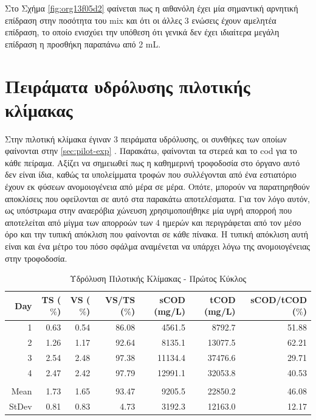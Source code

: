 \documentclass[11pt]{report}
\begin{document}
Στο Σχήμα \ref{fig:org13f05d2} φαίνεται πως η αιθανόλη έχει μία σημαντική αρνητική επίδραση στην ποσότητα του \acrshort{mix} και ότι οι άλλες 3 ενώσεις έχουν αμελητέα επίδραση, το οποίο ενισχύει την υπόθεση ότι γενικά δεν έχει ιδιαίτερα μεγάλη επίδραση η προσθήκη παραπάνω από 2 mL.

\section{Πειράματα υδρόλυσης πιλοτικής κλίμακας}
\label{sec:org32eaf29}
Στην πιλοτική κλίμακα έγιναν 3 πειράματα υδρόλυσης, οι συνθήκες των οποίων φαίνονται στην \autoref{sec:pilot-exp} . Παρακάτω, φαίνονται τα στερεά και το \acrshort{cod} για το κάθε πείραμα. Αξίζει να σημειωθεί πως η καθημερινή τροφοδοσία στο όργανο αυτό δεν είναι ίδια, καθώς τα υπολείμματα τροφών που συλλέγονται από ένα εστιατόριο έχουν εκ φύσεων ανομοιογένεια από μέρα σε μέρα. Οπότε, μπορούν να παρατηρηθούν αποκλίσεις που οφείλονται σε αυτό στα παρακάτω αποτελέσματα. Για τον λόγο αυτόν, ως υπόστρωμα στην αναερόβια χώνευση χρησιμοποιήθηκε μία υγρή απορροή που αποτελείται από μίγμα των απορροών των 4 ημερών και περιγράφεται από τον μέσο όρο και την τυπική απόκλιση που φαίνονται σε κάθε πίνακα. Η τυπική απόκλιση αυτή είναι και ένα μέτρο του πόσο σφάλμα αναμένεται να υπάρχει λόγω της ανομοιογένειας στην τροφοδοσία.

\begin{table}[htbp]
\caption{\label{tab:org8c8d9fb}Υδρόλυση Πιλοτικής Κλίμακας - Πρώτος Κύκλος}
\centering
\begin{tabular}{rrrrrrr}
Day & TS (\(\%\)) & VS (\(\%\)) & VS/TS (\(\%\)) & sCOD (mg/L) & tCOD (mg/L) & sCOD/tCOD (\(\%\))\\[0pt]
\hline
1 & 0.63 & 0.54 & 86.08 & 4561.5 & 8792.7 & 51.88\\[0pt]
2 & 1.26 & 1.17 & 92.64 & 8135.1 & 13077.5 & 62.21\\[0pt]
3 & 2.54 & 2.48 & 97.38 & 11134.4 & 37476.6 & 29.71\\[0pt]
4 & 2.47 & 2.42 & 97.79 & 12991.1 & 32053.8 & 40.53\\[0pt]
 &  &  &  &  &  & \\[0pt]
Mean & 1.73 & 1.65 & 93.47 & 9205.5 & 22850.2 & 46.08\\[0pt]
StDev & 0.81 & 0.83 & 4.73 & 3192.3 & 12163.0 & 12.17\\[0pt]
\end{tabular}
\end{table}
\end{document}

